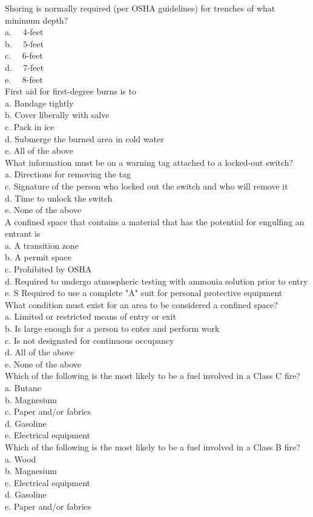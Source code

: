 Shoring is normally required (per OSHA guidelines) for trenches of what minimum depth?\\
a. $\quad 4$-feet\\
b. $\quad 5$-feet\\
c. $\quad 6$-feet\\
d. $\quad 7$-feet\\
e. $\quad 8$-feet\\

  First aid for first-degree burns is to\\
a. Bandage tightly\\
b. Cover liberally with salve\\
c. Pack in ice\\
d. Submerge the burned area in cold water\\
e. All of the above\\
  What information must be on a warning tag attached to a locked-out switch?\\
a. Directions for removing the tag\\
c. Signature of the person who locked out the switch and who will remove it\\
d. Time to unlock the switch\\
e. None of the above\\
  A confined space that contains a material that has the potential for engulfing an entrant is\\
a. A transition zone\\
b. A permit space\\
c. Prohibited by OSHA\\
d. Required to undergo atmospheric testing with ammonia solution prior to entry\\
e. S Required to use a complete "A" suit for personal protective equipment\\
 What condition must exist for an area to be considered a confined space?\\
a. Limited or restricted means of entry or exit\\
b. Is large enough for a person to enter and perform work\\
c. Is not designated for continuous occupancy\\
d. All of the above\\
e. None of the above\\
Which of the following is the most likely to be a fuel involved in a Class C fire?\\
a. Butane\\
b. Magnesium\\
c. Paper and/or fabrics\\
d. Gasoline\\
e. Electrical equipment\\
  Which of the following is the most likely to be a fuel involved in a Class B fire?\\
a. Wood\\
b. Magnesium\\
c. Electrical equipment\\
d. Gasoline\\
e. Paper and/or fabrics\\

